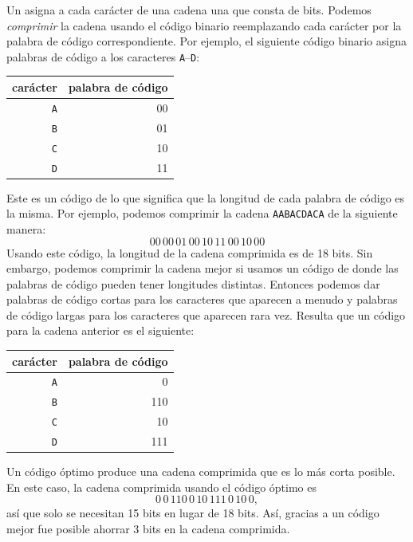 
Un  asigna a cada carácter
de una cadena una  que consta de bits.
Podemos \emph{comprimir} la cadena usando el código binario
reemplazando cada carácter por la
palabra de código correspondiente.
Por ejemplo, el siguiente código binario
asigna palabras de código a los caracteres
\texttt{A}–\texttt{D}:
\begin{center}
\begin{tabular}{rr}
carácter & palabra de código \\
\hline
\texttt{A} & 00 \\
\texttt{B} & 01 \\
\texttt{C} & 10 \\
\texttt{D} & 11 \\
\end{tabular}
\end{center}
Este es un código de 
lo que significa que la longitud de cada
palabra de código es la misma.
Por ejemplo, podemos comprimir la cadena
\texttt{AABACDACA} de la siguiente manera:
\[00\,00\,01\,00\,10\,11\,00\,10\,00\]
Usando este código, la longitud de la cadena
comprimida es de 18 bits.
Sin embargo, podemos comprimir la cadena mejor
si usamos un código de 
donde las palabras de código pueden tener longitudes distintas.
Entonces podemos dar palabras de código cortas para
los caracteres que aparecen a menudo
y palabras de código largas para los caracteres
que aparecen rara vez.
Resulta que un código 
para la cadena anterior es el siguiente:
\begin{center}
\begin{tabular}{rr}
carácter & palabra de código \\
\hline
\texttt{A} & 0 \\
\texttt{B} & 110 \\
\texttt{C} & 10 \\
\texttt{D} & 111 \\
\end{tabular}
\end{center}
Un código óptimo produce una cadena comprimida
que es lo más corta posible.
En este caso, la cadena comprimida usando
el código óptimo es
\[0\,0\,110\,0\,10\,111\,0\,10\,0,\]
así que solo se necesitan 15 bits en lugar de 18 bits.
Así, gracias a un código mejor fue posible
ahorrar 3 bits en la cadena comprimida.

